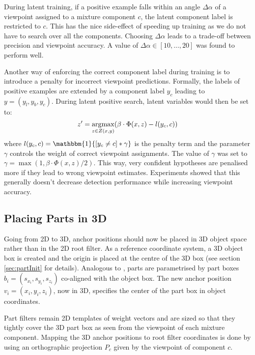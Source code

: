 During latent training, if a positive example falls within an angle $\Delta\alpha$ of a viewpoint assigned to a mixture component $c$, the latent component label is restricted to $c$. This has the nice side-effect of speeding up training as we do not have to search over all the components. Choosing $\Delta\alpha$ leads to a trade-off between precision and viewpoint accuracy. A value of $\Delta\alpha\in[10,...,20]$ was found to perform well. 

Another way of enforcing the correct component label during training is to introduce a penalty for incorrect viewpoint predictions. Formally, the labels of positive examples are extended by a component label $y_c$ leading to $y=(y_l,y_b,y_c)$. During latent positive search, latent variables would then be set to:
\begin{equation}\label{eq:penalty}
 z'=\operatorname*{\arg\!\max}_{z\in Z(x,y)}(\beta\cdot\Phi(x,z)-l(y_c,c))
\end{equation}
where $l(y_c,c)=\mathbbm{1}{ [y_c\neq c] *\gamma}$ is the penalty term and the parameter $\gamma$ controls the weight of correct viewpoint assignments. The value of $\gamma$ was set to $\gamma=\max(1,\beta\cdot\Phi(x,z)/2)$. This way, very confident hypotheses are penalised more if they lead to wrong viewpoint estimates.  Experiments showed that this generally doesn't decrease detection performance while increasing viewpoint accuracy. 

\subsection{Placing Parts in 3D}
Going from 2D to 3D, anchor positions should now be placed in 3D object space rather than in the 2D root filter. As a reference coordinate system, a 3D object box is created and the origin is placed at the centre of the 3D box (see section \ref{sec:partInit} for details). Analogous to \cite{6248075}, parts are parametrised by part boxes $b_i=(s_{x_i},s_{y_i},s_{z_i})$ co-aligned with the object box. The new anchor position $v_i=(x_i,y_i,z_i)$, now in 3D, specifies the center of the part box in object coordinates. 

Part filters remain 2D templates of weight vectors and are sized so that they tightly cover the 3D part box as seen from the viewpoint of each mixture component. Mapping the 3D anchor positions to root filter coordinates is done by using an orthographic projection $P_c$ given by the viewpoint of component $c$. 

